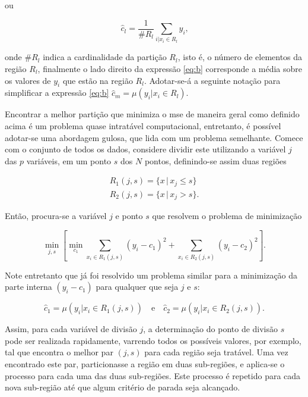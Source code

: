ou

\begin{equation}\label{eq:b}
\hat{c}_l=\frac{1}{\#R_l}\sum_{i|x_i \in{R_l}}y_i\mbox{,}
\end{equation}

onde $\#R_l$ indica a cardinalidade da partição $R_l$, isto é, o número de elementos da região $R_l$, finalmente o lado direito da expressão \eqref{eq:b} corresponde a média sobre os valores de $y_i$ que estão na região $R_l$. Adotar-se-á a seguinte notação para simplificar a expressão \eqref{eq:b} $\hat{c}_m=\mu(y_i|x_i\in{R_l})$. 

Encontrar a melhor partição que minimiza o mse de maneira geral como definido acima é um problema quase intratável computacional, entretanto, é possível adotar-se uma abordagem gulosa, que lida com um problema semelhante. Comece com o conjunto de todos os dados, considere dividir este utilizando a variável $j$ das $p$ variáveis, em um ponto $s$ dos $N$ pontos, definindo-se assim duas regiões

\begin{align}
R_1(j,s) = \{x\,|\,x_j\le{s}\}\\
R_2(j,s) = \{x\,|\,x_j>s\}\mbox{.}
\end{align}

Então, procura-se a variável $j$ e ponto $s$ que resolvem o problema de minimização

\begin{equation}
\min_{j,s}\left[\min_{c_1}\sum_{x_i\in{R_1(j,s)}}(y_i-c_1)^2+\sum_{x_i\in{R_2(j,s)}}(y_i-c_2)^2\right]\mbox{.}
\end{equation}

Note entretanto que já foi resolvido um problema similar para a minimização da parte interna $(y_i-c_1)$ para qualquer que seja $j$ e $s$:

\begin{equation}
\hat{c}_1=\mu(y_i|x_i\in{R_1(j,s)})\quad\mbox{e}\quad\hat{c}_2=\mu(y_i|x_i\in{R_2(j,s)})\mbox{.}
\end{equation}

Assim, para cada variável de divisão $j$, a determinação do ponto de divisão $s$ pode ser realizada rapidamente, varrendo todos os possíveis valores, por exemplo, tal que encontra o melhor par $(j,s)$ para cada região seja tratável. Uma vez encontrado este par, particionasse a região em duas sub-regiões, e aplica-se o processo para cada uma das duas sub-regiões. Este processo é repetido para cada nova sub-região até que algum critério de parada seja alcançado.

